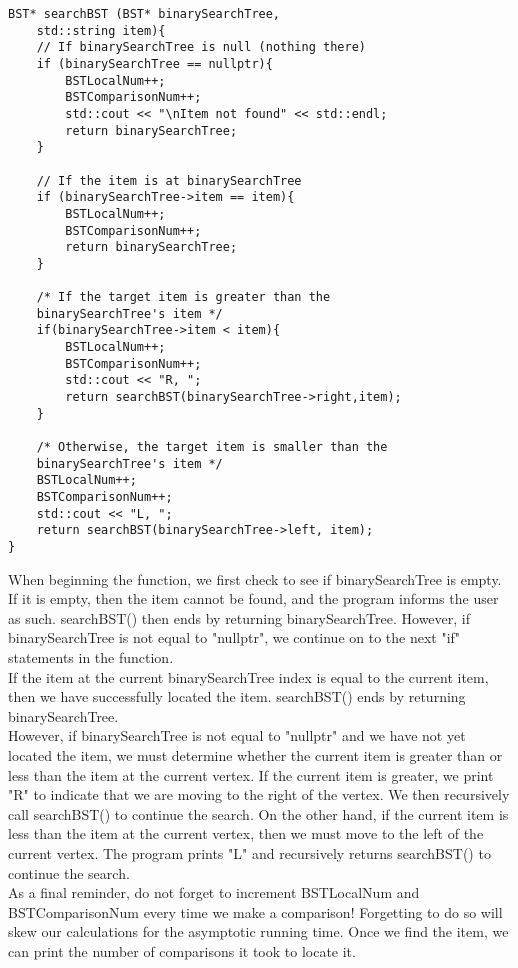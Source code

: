 \documentclass{article}
\begin{document}
\begin{lstlisting}
BST* searchBST (BST* binarySearchTree, 
    std::string item){
    // If binarySearchTree is null (nothing there)
    if (binarySearchTree == nullptr){
        BSTLocalNum++;
        BSTComparisonNum++;
        std::cout << "\nItem not found" << std::endl;
        return binarySearchTree;
    }
    
    // If the item is at binarySearchTree
    if (binarySearchTree->item == item){
        BSTLocalNum++;
        BSTComparisonNum++;
        return binarySearchTree;
    }

    /* If the target item is greater than the 
    binarySearchTree's item */
    if(binarySearchTree->item < item){
        BSTLocalNum++;
        BSTComparisonNum++;
        std::cout << "R, ";
        return searchBST(binarySearchTree->right,item);
    }

    /* Otherwise, the target item is smaller than the 
    binarySearchTree's item */
    BSTLocalNum++;
    BSTComparisonNum++;
    std::cout << "L, ";
    return searchBST(binarySearchTree->left, item);
}
\end{lstlisting}
When beginning the function, we first check to see if binarySearchTree is empty. If it is empty, then the item cannot be found, and the program informs the user as such. searchBST() then ends by returning binarySearchTree. However, if binarySearchTree is not equal to "nullptr", we continue on to the next "if" statements in the function. \\
If the item at the current binarySearchTree index is equal to the current item, then we have successfully located the item. searchBST() ends by returning binarySearchTree. \\
However, if binarySearchTree is not equal to "nullptr" and we have not yet located the item, we must determine whether the current item is greater than or less than the item at the current vertex. If the current item is greater, we print "R" to indicate that we are moving to the right of the vertex. We then recursively call searchBST() to continue the search. On the other hand, if the current item is less than the item at the current vertex, then we must move to the left of the current vertex. The program prints "L" and recursively returns searchBST() to continue the search. \\
As a final reminder, do not forget to increment BSTLocalNum and BSTComparisonNum every time we make a comparison! Forgetting to do so will skew our calculations for the asymptotic running time. Once we find the item, we can print the number of comparisons it took to locate it. \\
\end{document}
